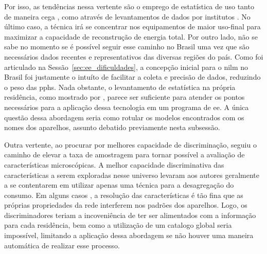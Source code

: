 Por isso, as tendências nessa vertente são o emprego de estatística de
uso tanto de maneira cega \cite{nilm_zeifman_vast_2011,
nilm_zeifman_vastext_approach_2012,
nilm_zeifman_statistical_vastext_1stws_2012}, como através de
levantamentos de dados por institutos
\cite{nilm_zeifman_statistical_naive_enduses_2013}. No último caso, a
técnica irá se concentrar nos equipamentos de maior uso-final para
maximizar a capacidade de reconstrução de energia total. Por outro
lado, não se sabe no momento se é possível seguir esse caminho no
Brasil uma vez que são necessários dados recentes e representativos
das diversas regiões do país. Como foi articulado na
Sessão~\ref{sec:ee_dificuldades}, a concepção inicial para o
\gls{nilm} no Brasil foi justamente o intuíto de facilitar a coleta e
precisão de dados, reduzindo o peso das \glspl{pph}. Nada obstante, o
levantamento de estatística na própria residência, como mostrado por
\cite{nilm_zeifman_vastext_approach_2012,nilm_zeifman_statistical_vastext_1stws_2012},
parece ser suficiente para atender os pontos necessários para a
aplicação dessa tecnologia em um programa de \gls{ee}. A única questão
dessa abordagem seria como rotular os modelos encontrados com os
nomes dos aparelhos, assunto debatido previamente nesta subsessão.

Outra vertente, ao procurar por melhores capacidade de discriminação,
seguiu o caminho de elevar a taxa de amostragem \cite{
nilm_zeifman_vast_hisample_pdfmerge_2011,nilm_liang_pt1_2010_34,
nilm_liang_pt2_2010_40,nilm_patel_2007_29,nilm_gupta_patel_2010_30,
nilm_lee_variable_speed_estimation_2005_24,
nilm_wichakool_2009_25,nilm_shaw_2008_26,nilm_berges_2008_7,nilm_berges_2009_36,
2010_nilm_melhorando_pph_usa_37,nilm_chan_2000_31,nilm_coppe_nascimento,
nilm_lee_2004_32,nilm_lam_2007_33, nilm_srinivasan_nn_2006_27,
nilm_itajuba_rodrigues,nilm_suzuki_2011_35} para tornar possível a
avaliação de características microscópicas. A melhor capacidade
discriminativa das características a serem exploradas nesse universo
levaram aos autores geralmente a se contentarem em utilizar apenas uma
técnica para a desagregação do consumo. Em alguns casos \cite{
nilm_patel_2007_29,nilm_gupta_patel_2010_30}, a
resolução das características é tão fina que as próprias propriedades
da rede interferem nos padrões dos aparelhos. Logo, os discriminadores 
teriam a incoveniência de ter ser alimentados com a informação para
cada residência, bem como a utilização de um catalogo global seria
impossível, limitando a aplicação dessa abordagem se não houver
uma maneira automática de realizar esse processo. 

